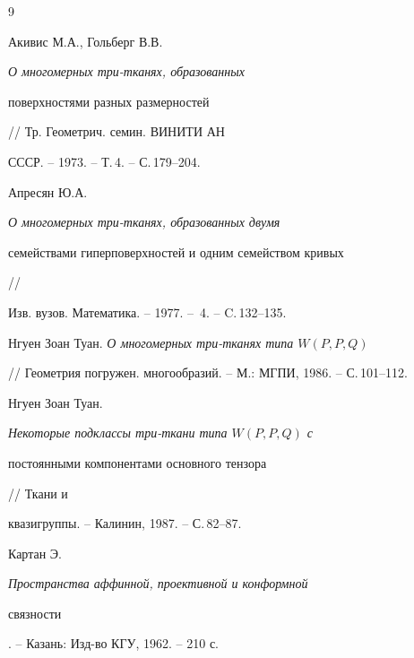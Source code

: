 \begin{thebibliography}{9} 


 




Акивис М.А., Гольберг В.В. {\em О многомерных три-тканях, образованных 


поверхностями разных размерностей} // Тр. Геометрич. семин. ВИНИТИ АН 


СССР. -- 1973. -- Т.\,4. -- С.\,179--204. 




Апресян Ю.А. {\em О многомерных три-тканях, образованных двумя 


семействами гиперповерхностей и одним семейством кривых} // 


Изв. вузов. Математика. -- 1977. -- \No\,4. -- C.\,132--135. 




Нгуен Зоан Туан. {\em О многомерных три-тканях типа $W(P,P,Q)$} 


// Геометрия погружен. многообразий. -- М.: МГПИ, 1986. -- С.\,101--112. 




Нгуен Зоан Туан. {\em Некоторые подклассы три-ткани типа $W(P,P,Q)$ с 


постоянными компонентами основного тензора} // Ткани и 


квазигруппы. -- Калинин, 1987. -- С.\,82--87. 




Картан Э. {\em Пространства аффинной, проективной и конформной 


связности}. -- Казань: Изд-во КГУ, 1962. -- 210 с. 


 


\end{thebibliography} 


 


\vskip 2cm 


 








 


\label{end} 


 


